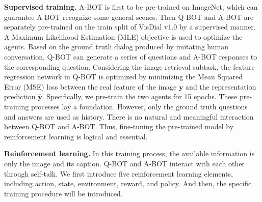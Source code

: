 \documentclass[review]{elsarticle}
\begin{document}
	\textbf{Supervised training.} A-BOT is first to be pre-trained on ImageNet, which can guarantee A-BOT recognize some general scenes. Then Q-BOT and A-BOT are separately pre-trained on the train split of VisDial v1.0 \cite{DBLP:conf/iccv/DasKMLB17} by a supervised manner. 
	A Maximum Likelihood Estimation (MLE) objective is used to optimize the agents. 
	Based on the ground truth dialog produced by imitating human conversation, Q-BOT can generate a series of questions and A-BOT responses to the corresponding question. 
	Considering the image retrieval subtask, the feature regression network in Q-BOT is optimized by minimizing the Mean Squared Error (MSE) loss between the real feature of the image $\textbf{y}$ and the representation prediction $\mathbf{\hat{y}}$. 
	Specifically, we pre-train the two agents for 15 epochs. These pre-training processes lay a foundation. However, only the ground truth questions and answers are used as history. There is no natural and meaningful interaction between Q-BOT and A-BOT.
	Thus, fine-tuning the pre-trained model by reinforcement learning is logical and essential.
	
	\textbf{Reinforcement learning.} In this training process, the available information is only the image and its caption. Q-BOT and A-BOT interact with each other through self-talk. 
	We first introduce five reinforcement learning elements, including action, state, environment, reward, and policy. And then, the specific training procedure will be introduced.
	
\end{document}
